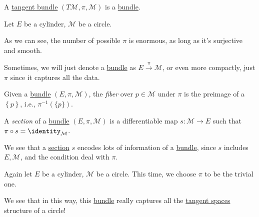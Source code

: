 \begin{eg}
	A \hyperref[def:tangent-bundle]{tangent bundle} \((T\mathcal{M} , \pi , \mathcal{M} )\) is a \hyperref[def:bundle]{bundle}.
\end{eg}

\begin{eg}
	Let \(E\) be a cylinder, \(\mathcal{M} \) be a circle.

	\begin{center}
	\end{center}
	As we can see, the number of possible \(\pi \) is enormous, as long as it's surjective and smooth.
\end{eg}

\begin{notation}
	Sometimes, we will just denote a \hyperref[def:bundle]{bundle} as \(E \overset{\pi }{\to } \mathcal{M} \), or even more compactly, just \(\pi \) since it captures all the data.
\end{notation}

\begin{definition}[Fiber]\label{def:fiber}
	Given a \hyperref[def:bundle]{bundle} \((E, \pi , \mathcal{M} )\), the \emph{fiber} over \(p\in \mathcal{M} \) under \(\pi\) is the preimage of a \(\left\{ p \right\} \), i.e., \(\pi ^{-1} (\{p\})\).
\end{definition}

\begin{definition}[Section]\label{def:section}
	A \emph{section} of a \hyperref[def:bundle]{bundle} \((E, \pi , \mathcal{M} )\) is a differentiable map \(s\colon \mathcal{M} \to E\) such that \(\pi \circ s =\identity_{\mathcal{M} } \).
\end{definition}

\begin{remark}
	We see that a \hyperref[def:section]{section} \(s\) encodes lots of information of a \hyperref[def:bundle]{bundle}, since \(s\) includes \(E, \mathcal{M}\), and the condition deal with \(\pi \).
\end{remark}


\begin{eg}
	Again let \(E\) be a cylinder, \(\mathcal{M} \) be a circle. This time, we choose \(\pi \) to be the trivial one.

	\begin{center}
	\end{center}

	We see that in this way, this \hyperref[def:bundle]{bundle} really captures all the \hyperref[def:tangent-space]{tangent spaces} structure of a circle!
\end{eg}

